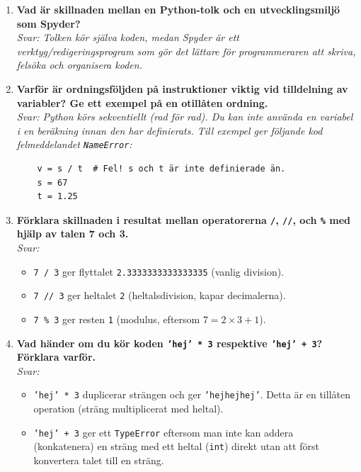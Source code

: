 \documentclass[11pt,a4paper]{article}
\begin{document}
\begin{enumerate}[label=\bfseries\color{primary}Fråga \arabic*:, leftmargin=1.8cm]
    \item {\bfseries Vad är skillnaden mellan en Python-tolk och en utvecklingsmiljö som Spyder?}
    \\ {\itshape Svar: Tolken kör själva koden, medan Spyder är ett verktyg/redigeringsprogram som gör det lättare för programmeraren att skriva, felsöka och organisera koden.}
    
    \item {\bfseries Varför är ordningsföljden på instruktioner viktig vid tilldelning av variabler? Ge ett exempel på en otillåten ordning.}
    \\ {\itshape Svar: Python körs sekventiellt (rad för rad). Du kan inte använda en variabel i en beräkning innan den har definierats. Till exempel ger följande kod felmeddelandet \texttt{NameError}:}
    \begin{verbatim}
    v = s / t  # Fel! s och t är inte definierade än.
    s = 67
    t = 1.25
    \end{verbatim}

    \item {\bfseries Förklara skillnaden i resultat mellan operatorerna \texttt{/}, \texttt{//}, och \texttt{\%} med hjälp av talen 7 och 3.}
    \\ {\itshape Svar:}
    \begin{itemize}
        \item \texttt{7 / 3} ger flyttalet \texttt{2.3333333333333335} (vanlig division).
        \item \texttt{7 // 3} ger heltalet \texttt{2} (heltalsdivision, kapar decimalerna).
        \item \texttt{7 \% 3} ger resten \texttt{1} (modulus, eftersom $7 = 2 \times 3 + 1$).
    \end{itemize}

    \item {\bfseries Vad händer om du kör koden \texttt{'hej' * 3} respektive \texttt{'hej' + 3}? Förklara varför.}
    \\ {\itshape Svar:} 
    \begin{itemize}
        \item \texttt{'hej' * 3} duplicerar strängen och ger \texttt{'hejhejhej'}. Detta är en tillåten operation (sträng multiplicerat med heltal).
        \item \texttt{'hej' + 3} ger ett \texttt{TypeError} eftersom man inte kan addera (konkatenera) en sträng med ett heltal (\texttt{int}) direkt utan att först konvertera talet till en sträng.
    \end{itemize}


\end{enumerate}
\end{document}
